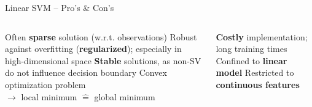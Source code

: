 \begin{frame}{Linear SVM -- Pro's \& Con's}

\begin{columns}[onlytextwidth]
  \begin{column}{0.5\textwidth}
    \footnotesize
    \begin{itemize}
      \positem Often \textbf{sparse} solution (w.r.t. observations)
      \positem Robust against overfitting (\textbf{regularized}); especially in 
      high-dimensional space
      \positem \textbf{Stable} solutions, as non-SV do not influence decision boundary
      \positem Convex optimization problem \\
      $\rightarrow$ local minimum $\hat{=}$ global minimum
    \end{itemize}
  \end{column}

  \begin{column}{0.5\textwidth}
    \footnotesize
    \begin{itemize}
      \negitem \textbf{Costly} implementation; long training times
      \negitem Confined to \textbf{linear model}
      \negitem Restricted to \textbf{continuous features}
    \end{itemize}
  \end{column}
\end{columns}

\vfill

\small


\end{frame}